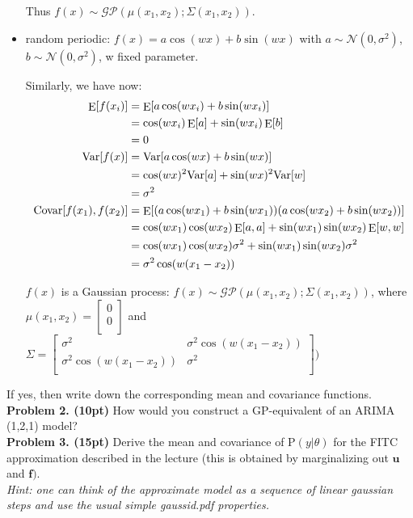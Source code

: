 \documentclass[12pt]{article}
\DeclareMathOperator*{\E}{\rm E}
\newcommand{\p}{\mathrm{P}}
\newcommand{\vect}[1]{\bm{#1}} %
\newcommand{\Var}{\mathrm{Var}}
\newcommand{\Covar}{\mathrm{Covar}}
\begin{document}
\begin{itemize}
Thus $ f(x) \sim  \mathcal{GP}(\mu(x_1, x_2); \Sigma(x_1,x_2))$.

\item random periodic: $f(x) = a \cos(wx)+ b \sin(wx)$ with $a \sim \mathcal{N}(0,\sigma^2)$, $b \sim \mathcal{N}(0,\sigma^2)$, w fixed parameter.

Similarly, we have now:
\begin{align*}
	\E[f(x_i)]			&=	\E[a \cos(w x_i) + b \sin(w x_i)] \\
					&= 	\cos(w x_i) \E[a] + \sin(w x_i) \E[b] \\
					&=	0 \\
	\Var[f(x)]			&=	\Var[a \cos(wx)+ b \sin(wx)] \\
					&= 	\cos(wx)^2 \Var[a] + \sin(wx)^2 \Var[w] \\
					&=	\sigma^2  \\					
	\Covar[f(x_1),f(x_2)]	&=	\E[ (a \cos(w x_1) + b  \sin(w x_1)) (a \cos(w x_2) + b  \sin(w x_2))] \\
					&=	\cos(w x_1) \cos(w x_2) \E[a,a] + \sin(w x_1) \sin(w x_2) \E[w,w]  \\
					&=	\cos(w x_1) \cos(w x_2)  \sigma^2 +  \sin(w x_1) \sin(w x_2) \sigma^2  \\
					&= 	\sigma^2 \cos(w (x_1 - x_2))		
\end{align*}

$f(x)$ is a Gaussian process: $ f(x) \sim  \mathcal{GP}(\mu(x_1, x_2); \Sigma(x_1,x_2))$, where $ \mu(x_1, x_2) = \begin{bmatrix}
		0 \\
		0 \\
	\end{bmatrix}$ and $\Sigma =  \begin{bmatrix}
		\sigma^2	& \sigma^2 \cos(w (x_1 - x_2))	 \\
		\sigma^2 \cos(w (x_1 - x_2))	&  \sigma^2 \\
	\end{bmatrix}
	\Big) $

\end{itemize}
If yes, then write down the corresponding mean and covariance functions.\\


\noindent \textbf{Problem 2. (10pt)} 
How would you construct a GP-equivalent of an ARIMA (1,2,1) model?\\

\noindent \textbf{Problem 3. (15pt)} 
Derive the mean and covariance of  $\mathrm{P}(y|\theta)$ for the FITC approximation described in the lecture (this is obtained by marginalizing out $\mathbf{u}$ and $\mathbf{f})$.\\
\noindent \emph{Hint: one can think of the approximate model as a sequence of linear gaussian steps and use the usual simple gaussid.pdf properties.}\\
\end{document}
